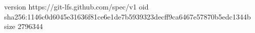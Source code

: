 version https://git-lfs.github.com/spec/v1
oid sha256:1146c0d6045e31636f81ce6e1de7b5939323decff9ca6467e57870b5edc1344b
size 2796344
